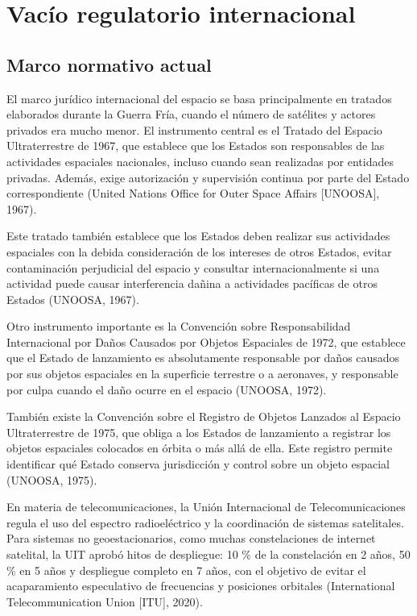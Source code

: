 \section{Vacío regulatorio internacional}

\subsection{Marco normativo actual}

El marco jurídico internacional del espacio se basa principalmente en tratados elaborados durante la Guerra Fría, cuando el número de satélites y actores privados era mucho menor. El instrumento central es el Tratado del Espacio Ultraterrestre de 1967, que establece que los Estados son responsables de las actividades espaciales nacionales, incluso cuando sean realizadas por entidades privadas. Además, exige autorización y supervisión continua por parte del Estado correspondiente (United Nations Office for Outer Space Affairs [UNOOSA], 1967).

Este tratado también establece que los Estados deben realizar sus actividades espaciales con la debida consideración de los intereses de otros Estados, evitar contaminación perjudicial del espacio y consultar internacionalmente si una actividad puede causar interferencia dañina a actividades pacíficas de otros Estados (UNOOSA, 1967).

Otro instrumento importante es la Convención sobre Responsabilidad Internacional por Daños Causados por Objetos Espaciales de 1972, que establece que el Estado de lanzamiento es absolutamente responsable por daños causados por sus objetos espaciales en la superficie terrestre o a aeronaves, y responsable por culpa cuando el daño ocurre en el espacio (UNOOSA, 1972).

También existe la Convención sobre el Registro de Objetos Lanzados al Espacio Ultraterrestre de 1975, que obliga a los Estados de lanzamiento a registrar los objetos espaciales colocados en órbita o más allá de ella. Este registro permite identificar qué Estado conserva jurisdicción y control sobre un objeto espacial (UNOOSA, 1975).

En materia de telecomunicaciones, la Unión Internacional de Telecomunicaciones regula el uso del espectro radioeléctrico y la coordinación de sistemas satelitales. Para sistemas no geoestacionarios, como muchas constelaciones de internet satelital, la UIT aprobó hitos de despliegue: 10 \% de la constelación en 2 años, 50 \% en 5 años y despliegue completo en 7 años, con el objetivo de evitar el acaparamiento especulativo de frecuencias y posiciones orbitales (International Telecommunication Union [ITU], 2020).

